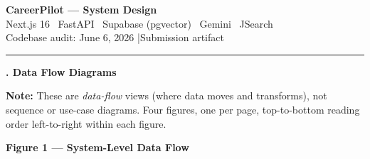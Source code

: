 \documentclass[11pt,a4paper]{article}
\newcommand{\flowtitle}[1]{%
  \vspace{0.6em}%
  \noindent\textbf{#1}\par\vspace{0.35em}%
}
\newcommand{\sectiontitle}[1]{%
  \vspace{0.9em}%
  \noindent
  \colorbox{sectiontitlebg}{%
    \parbox{\dimexpr\linewidth-2\fboxsep}{%
      \vspace{6pt}%
      {\fontsize{18}{22}\bfseries\selectfont #1}%
      \vspace{6pt}%
    }%
  }%
  \par\vspace{0.55em}%
}
\begin{document}
\begin{center}
  {\LARGE\bfseries CareerPilot --- System Design}\\[0.4em]
  {\small Next.js 16 \textbullet\ FastAPI \textbullet\ Supabase (pgvector) \textbullet\ Gemini \textbullet\ JSearch}\\[0.2em]
  {\footnotesize Codebase audit: June 6, 2026 \quad|\quad Submission artifact}
\end{center}
\vspace{0.5em}
\hrule
\vspace{0.8em}

\sectiontitle{1. Data Flow Diagrams}

\noindent
\textbf{Note:} These are \emph{data-flow} views (where data moves and transforms),
not sequence or use-case diagrams. Four figures, one per page, top-to-bottom
reading order left-to-right within each figure.

\flowtitle{Figure 1 --- System-Level Data Flow}
\end{document}
